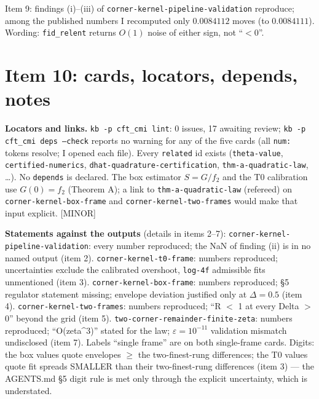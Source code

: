 \documentclass[11pt]{article}
\begin{document}
\begin{verdictok}
Item 9: findings (i)--(iii) of \texttt{corner-kernel-pipeline-validation} reproduce; among the published numbers I recomputed
only $0.0084112$ moves (to $0.0084111$). Wording: \texttt{fid\_relent} returns $O(1)$ noise of either sign, not ``$<0$''.
\end{verdictok}

\section{Item 10: cards, locators, depends, notes}
\textbf{Locators and links.} \texttt{kb -p cft\_cmi lint}: 0 issues, 17 awaiting review; \texttt{kb -p cft\_cmi deps --check}
reports no warning for any of the five cards (all \texttt{num:} tokens resolve; I opened each file). Every \texttt{related} id
exists (\texttt{theta-value}, \texttt{certified-numerics}, \texttt{dhat-quadrature-certification}, \texttt{thm-a-quadratic-law}, \ldots).
No \texttt{depends} is declared. The box estimator $S=G/f_2$ and the T0 calibration use $G(0)=f_2$ (Theorem A); a link to
\texttt{thm-a-quadratic-law} (refereed) on \texttt{corner-kernel-box-frame} and \texttt{corner-kernel-two-frames} would make that
input explicit. [MINOR]

\textbf{Statements against the outputs} (details in items 2--7): \texttt{corner-kernel-pipeline-validation}: every number
reproduced; the NaN of finding (ii) is in no named output (item 2). \texttt{corner-kernel-t0-frame}: numbers reproduced;
uncertainties exclude the calibrated overshoot, \texttt{log-4f} admissible fits unmentioned (item 3). \texttt{corner-kernel-box-frame}:
numbers reproduced; \S5 regulator statement missing; envelope deviation justified only at $\Delta=0.5$ (item 4).
\texttt{corner-kernel-two-frames}: numbers reproduced; ``R $<$ 1 at every Delta $>$ 0'' beyond the grid (item 5).
\texttt{two-corner-remainder-finite-zeta}: numbers reproduced; ``O(zeta\^{}3)'' stated for the law; $\varepsilon=10^{-11}$
validation mismatch undisclosed (item 7). Labels ``single frame'' are on both single-frame cards. Digits: the box values quote
envelopes $\ge$ the two-finest-rung differences; the T0 values quote fit spreads SMALLER than their two-finest-rung differences
(item 3) --- the AGENTS.md \S5 digit rule is met only through the explicit uncertainty, which is understated.
\end{document}
